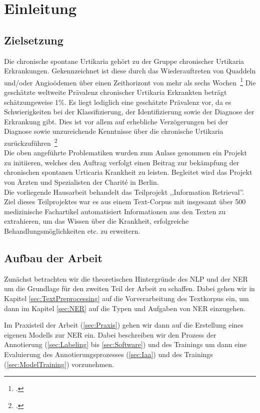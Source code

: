 \section{Einleitung}

\subsection{Zielsetzung}

Die chronische spontane Urtikaria gehört zu der Gruppe chronischer Urtikaria Erkrankungen. Gekennzeichnet ist diese
durch das Wiederauftreten von Quaddeln und/oder Angioödemen über einen Zeithorizont von mehr als sechs
Wochen~\footcite[\vglf][]{savic.2020}
Die geschätzte weltweite Prävalenz chronischer Urtikaria Erkrankten beträgt schätzungsweise 1\%. Es liegt lediglich eine
geschätzte Prävalenz vor, da es Schwierigkeiten bei der Klassifizierung, der Identifizierung sowie der Diagnose der
Erkrankung gibt. Dies ist vor allem auf erhebliche Verzögerungen bei der Diagnose sowie unzureichende Kenntnisse über
die chronische Urtikaria zurückzuführen~\footcite[\vglf][]{savic.2020}\\

Die oben angeführte Problematiken wurden zum Anlass genommen ein Projekt zu initiieren, welches den Auftrag verfolgt
einen Beitrag zur bekämpfung der chronischen spontanen Urticaria Krankheit zu leisten. Begleitet wird das Projekt von
Ärzten und Spezialisten der Charité in Berlin.\\

Die vorliegende Hausarbeit behandelt das Teilprojekt ,,Information Retrieval''. Ziel dieses Teilprojektes war es aus einem
Text-Corpus mit insgesamt über 500 medizinische Fachartikel automatisiert Informationen aus den Texten zu extrahieren,
um das Wissen über die Krankheit, erfolgreiche Behandlungsmöglichkeiten etc. zu erweitern.\\

\subsection{Aufbau der Arbeit}
Zunächst betrachten wir die theoretischen Hintergründe des \acf{NLP} und der \acf{NER} um die Grundlage für den zweiten Teil der Arbeit zu schaffen. Dabei gehen wir in Kapitel \ref{sec:TextPreprocessing} auf die Vorverarbeitung des Textkorpus ein, um dann im Kapitel \ref{sec:NER} auf die Typen und Aufgaben von \acf{NER} einzugehen.

Im Praxisteil der Arbeit (\ref{sec:Praxis}) gehen wir dann auf die Erstellung eines eigenen Modells zur \acf{NER} ein. Dabei beschreiben wir den Prozess der Annotierung (\ref{sec:Labeling} bis \ref{sec:Software}) und des Trainings um dann eine Evaluierung des Annotierungsprozesses (\ref{sec:Iaa}) und des Trainings (\ref{sec:ModelTraining}) vorzunehmen.

